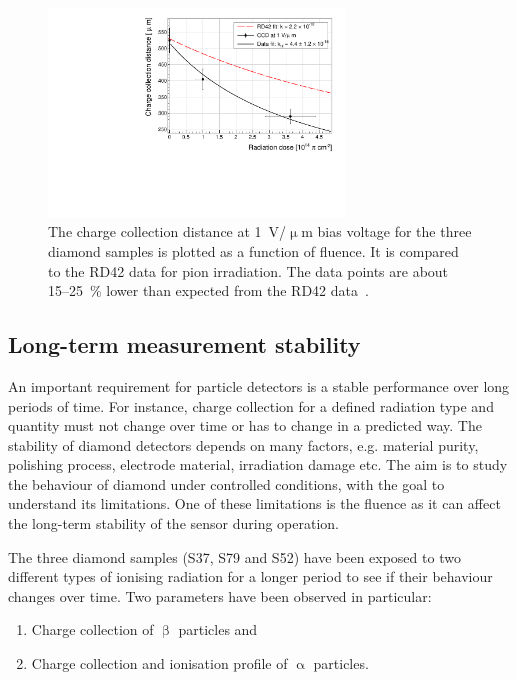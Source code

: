 \begin{figure}[!t]
\centering
\includegraphics[width=0.70\textwidth]{03_measurement_results/scripts/plots/radfactor1}
\caption{The charge collection distance at 1~V/$\upmu$m bias voltage for the three diamond samples is plotted as a function of fluence. It is compared to the RD42 data for pion irradiation. The data points are about 15--25~\% lower than expected from the RD42 data~\cite{RD42IRRAD:00000}.}
 \label{fig:radfactor}
\end{figure}



\subsection{Long-term measurement stability}
\label{sec:longterm}
An important requirement for particle detectors is a stable performance over long periods of time. For instance, charge collection for a defined radiation type and quantity must not change over time or has to change in a predicted way. The stability of diamond detectors depends on many factors, e.g. material purity, polishing process, electrode material, irradiation damage etc. The aim is to study the behaviour of diamond under controlled conditions, with the goal to understand its limitations. One of these limitations is the fluence as it can affect the long-term stability of the sensor during operation. 

The three diamond samples (S37, S79 and S52) have been exposed to two different types of ionising radiation for a longer period to see if their behaviour changes over time. Two parameters have been observed in particular: 
\begin{enumerate}
\item Charge collection of $\upbeta$ particles and 
\item Charge collection and ionisation profile of $\upalpha$ particles.
\end{enumerate}

